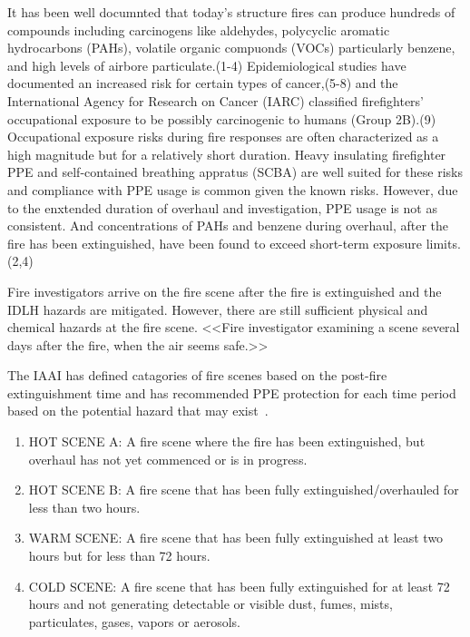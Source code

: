\documentclass[12pt,oneside]{book}
\begin{document}
It has been well documnted that today's structure fires can produce hundreds of compounds including carcinogens like aldehydes, polycyclic aromatic hydrocarbons (PAHs), volatile organic compuonds (VOCs) particularly benzene, and high levels of airbore particulate.(1-4) Epidemiological studies have documented an increased risk for certain types of cancer,(5-8) and the International Agency for Research on Cancer (IARC) classified firefighters’ occupational exposure to be possibly carcinogenic to humans (Group 2B).(9) Occupational exposure risks during fire responses are often characterized as a high magnitude but for a relatively short duration. Heavy insulating firefighter PPE and self-contained breathing appratus (SCBA) are well suited for these risks and compliance with PPE usage is common given the known risks. However, due to the enxtended duration of overhaul and investigation, PPE usage is not as consistent. And concentrations of PAHs and benzene during overhaul, after the fire has been extinguished, have  been found to exceed short-term exposure limits.(2,4) 

Fire investigators arrive on the fire scene after the fire is extinguished and the IDLH hazards are mitigated.  However, there are still sufficient physical and chemical hazards at the fire scene. 
 <<Fire investigator examining a scene several days after the fire, when the air seems safe.>>

The IAAI has defined catagories of fire scenes based on the post-fire extinguishment time and has recommended PPE protection for each time period based on the potential hazard that may exist~\cite{IAAI:2020}.   

\begin{enumerate}
\item HOT SCENE A: A fire scene where the fire has been extinguished, but overhaul has not yet commenced or is in progress.

\item HOT SCENE B: A fire scene that has been fully extinguished/overhauled for less than two hours.

\item  WARM SCENE: A fire scene that has been fully extinguished at least two hours but for less than 72 hours. 

\item COLD SCENE: A fire scene that has been fully extinguished for at least 72 hours and not generating detectable or visible dust, fumes, mists, particulates, gases, vapors or aerosols.

\end{enumerate}
\end{document}
